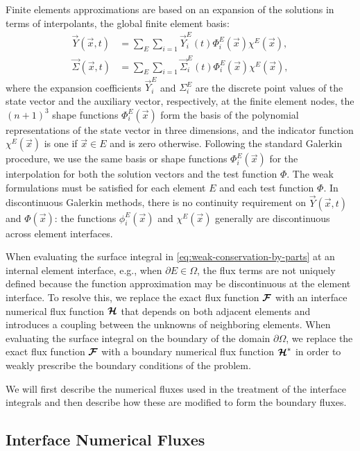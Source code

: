 \documentclass{report}
\numberwithin{equation}{section}
\begin{document}
Finite elements approximations are based on an expansion of the solutions in terms of interpolants, the global finite element basis:
\begin{align}
    \vec Y(\vec x, t) & = \sum_E \sum_{i=1} \vec Y_i^E(t) \Phi_i^E(\vec x) \chi^E(\vec x), \\
    \vec \Sigma(\vec x, t) & = \sum_E \sum_{i=1} \vec \Sigma^E_i(t) \Phi^E_i(\vec x) \chi^E(\vec x) ,
\end{align}
where the expansion coefficients $\vec Y_i^E$ and $\Sigma^E_i$ are the discrete point values of the state vector and the auxiliary vector, respectively, at the finite element nodes, the $(n+1)^3$ shape functions $\Phi_i^E(\vec x)$ form the basis of the polynomial representations of the state vector in three dimensions, and the indicator function $\chi^E(\vec x)$ is one if $\vec x \in E$ and is zero otherwise. Following the standard Galerkin procedure, we use the same basis or shape functions $\Phi_i^E(\vec x)$ for the interpolation for both the solution vectors and the test function $\Phi$.
The weak formulations must be satisfied for each element $E$ and each test function $\Phi$. In discontinuous Galerkin methods, there is no continuity requirement on $\vec Y(\vec x,t)$ and $\Phi(\vec x)$: the functions $\phi_i^E(\vec x)$ and $\chi^E(\vec x)$ generally are discontinuous across element interfaces.

When evaluating the surface integral in \eqref{eq:weak-conservation-by-parts} at an internal element interface, e.g., when $\partial E \in \Omega$, the flux terms are not uniquely defined because the function approximation may be discontinuous at the element interface. To resolve this, we replace the exact flux function $\boldsymbol{{\mathcal{F}}}$ with an interface numerical flux function $\boldsymbol{{\mathcal{H}}}$ that depends on both adjacent elements and introduces a coupling between the unknowns of neighboring elements. When evaluating the surface integral on the boundary of the domain $\partial \Omega$, we replace the exact flux function $\boldsymbol{{\mathcal{F}}}$ with a boundary numerical flux function $\boldsymbol{{\mathcal{H}}}^*$ in order to weakly prescribe the boundary conditions of the problem. 

We will first describe the numerical fluxes used in the treatment of the interface integrals and then describe how these are modified to form the boundary fluxes.

\subsection{Interface Numerical Fluxes}
\end{document}

